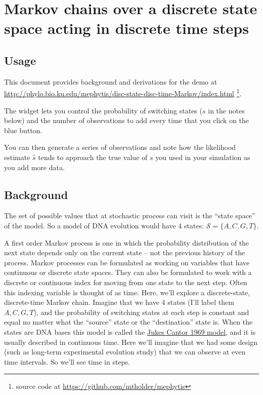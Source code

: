 \documentclass[11pt]{article}
\newcommand{\href}[2]{\url{#2}}
\begin{document}
\section*{Markov chains over a discrete state space acting in discrete time steps}
\subsection*{Usage}
This document provides background and derivations for the demo at
    \url{http://phylo.bio.ku.edu/mephytis/disc-state-disc-time-Markov/index.html}
    \footnote{source code at \url{https://github.com/mtholder/mephytis}}.

The widget lets you control the probability of switching states ($s$ in the notes below) and
    the number of observations to add every time that you click on the blue button.

You can then generate a series of observations and note how the likelihood estimate $\hat{s}$
    tends to approach the true value of $s$ you used in your simulation as you add more data.

\subsection*{Background}

The set of possible values that at stochastic process can visit is the ``state space'' of the model.
So a model of DNA evolution would have 4 states: $\mathcal{S} = \{A, C, G, T\}$.

A first order Markov process is one in which the probability distribution of the next state
    depends only on the current state -- not the previous history of the process.
Markov processes can be formulated as working on variables that have continuous or discrete state
    spaces.
They can also be formulated to work with a discrete or continuous index for moving from one state
    to the next step.
Often this indexing variable is thought of as time.
Here, we'll explore a discrete-state, discrete-time Markov chain.
Imagine that we have 4 states (I'll label them $A, C, G, T$), and the probability of switching
 states at each step is constant and equal no matter what the ``source'' state  or the
 ``destination'' state is.
When the states are DNA bases this model is called the
    \href{https://en.wikipedia.org/wiki/Models_of_DNA_evolution#JC69_model_(Jukes_and_Cantor_1969)}{Jukes Cantor 1969 model},
    and it is usually described in continuous time.
Here we'll imagine that we had some design (such as long-term experimental evolution study) that
    we can observe at even time intervals.
So we'll see time in steps.
\end{document}
